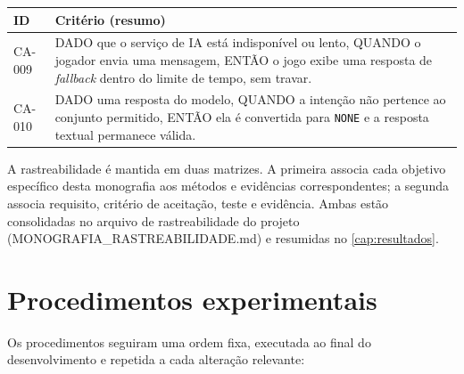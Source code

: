 \begin{quadro}[htbp]
\centering
\caption{Exemplos de critérios de aceitação usados como contrato de implementação.}
\label{quad:ca_exemplos}
\footnotesize
\begin{tabular}{@{}>{\raggedright\arraybackslash}p{1.4cm} >{\raggedright\arraybackslash}p{11.6cm}@{}}
\toprule
ID & Critério (resumo) \\
\midrule
CA-009 & DADO que o serviço de IA está indisponível ou lento, QUANDO o jogador envia uma mensagem, ENTÃO o jogo exibe uma resposta de \emph{fallback} dentro do limite de tempo, sem travar. \\
CA-010 & DADO uma resposta do modelo, QUANDO a intenção não pertence ao conjunto permitido, ENTÃO ela é convertida para \texttt{NONE} e a resposta textual permanece válida. \\
\bottomrule
\end{tabular}
\par\vspace{2pt}{\footnotesize Fonte: elaborado pelo autor (2026), a partir da especificação do projeto.}
\end{quadro}

A rastreabilidade é mantida em duas matrizes. A primeira associa cada
objetivo específico desta monografia aos métodos e evidências correspondentes;
a segunda associa requisito, critério de aceitação, teste e evidência. Ambas
estão consolidadas no arquivo de rastreabilidade do projeto
(MONOGRAFIA\_RASTREABILIDADE.md) e resumidas no
\autoref{cap:resultados}.

\section{Procedimentos experimentais}
\label{sec:procedimentos}

Os procedimentos seguiram uma ordem fixa, executada ao final do
desenvolvimento e repetida a cada alteração relevante:


